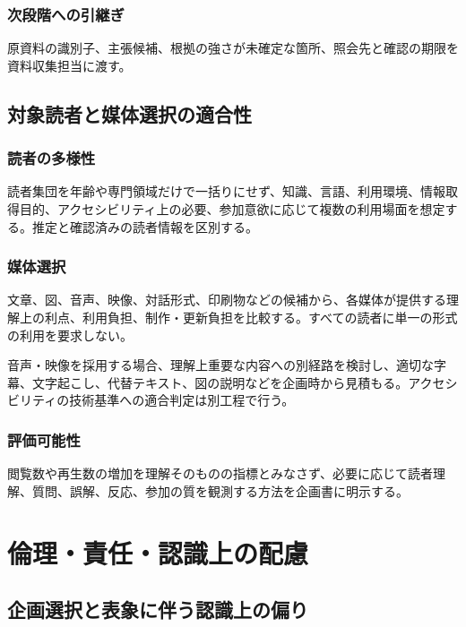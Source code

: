 \documentclass[a4paper,11pt]{article}
\begin{document}
\subsubsection{次段階への引継ぎ}
\par 原資料の識別子、主張候補、根拠の強さが未確定な箇所、照会先と確認の期限を資料収集担当に渡す。\par\medskip
\subsection{対象読者と媒体選択の適合性}
\subsubsection{読者の多様性}
\par 読者集団を年齢や専門領域だけで一括りにせず、知識、言語、利用環境、情報取得目的、アクセシビリティ上の必要、参加意欲に応じて複数の利用場面を想定する。推定と確認済みの読者情報を区別する。\par\medskip
\subsubsection{媒体選択}
\par 文章、図、音声、映像、対話形式、印刷物などの候補から、各媒体が提供する理解上の利点、利用負担、制作・更新負担を比較する。すべての読者に単一の形式の利用を要求しない。\par\medskip
\par 音声・映像を採用する場合、理解上重要な内容への別経路を検討し、適切な字幕、文字起こし、代替テキスト、図の説明などを企画時から見積もる。アクセシビリティの技術基準への適合判定は別工程で行う。\par\medskip
\subsubsection{評価可能性}
\par 閲覧数や再生数の増加を理解そのものの指標とみなさず、必要に応じて読者理解、質問、誤解、反応、参加の質を観測する方法を企画書に明示する。\par\medskip
\section{倫理・責任・認識上の配慮}
\subsection{企画選択と表象に伴う認識上の偏り}
\end{document}

